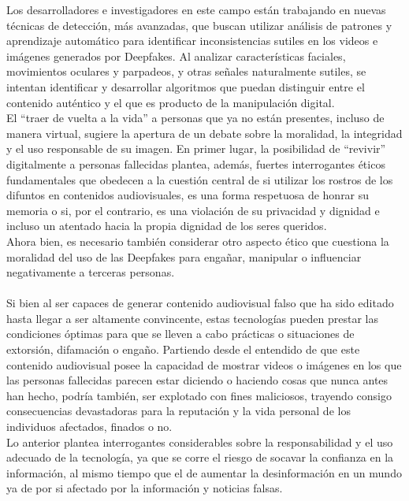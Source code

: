 Los desarrolladores e investigadores en este campo están trabajando en nuevas técnicas de detección, más avanzadas, que buscan utilizar análisis de patrones y aprendizaje automático para identificar inconsistencias sutiles en los videos e imágenes generados por Deepfakes. Al analizar características faciales, movimientos oculares y parpadeos, y otras señales naturalmente sutiles, se intentan identificar y desarrollar algoritmos que puedan distinguir entre el contenido auténtico y el que es producto de la manipulación digital.\\
El “traer de vuelta a la vida” a personas que ya no están presentes, incluso de manera virtual, sugiere la apertura de un debate sobre la moralidad, la integridad y el uso responsable de su imagen. En primer lugar, la posibilidad de “revivir” digitalmente a personas fallecidas plantea, además, fuertes interrogantes éticos fundamentales que obedecen a la cuestión central de si utilizar los rostros de los difuntos en contenidos audiovisuales, es una forma respetuosa de honrar su memoria o si, por el contrario, es una violación de su privacidad y dignidad e incluso un atentado hacia la propia dignidad de los seres queridos.\\
Ahora bien, es necesario también considerar otro aspecto ético que cuestiona la moralidad del uso de las Deepfakes para engañar, manipular o influenciar negativamente a terceras personas.\\\\
Si bien al ser capaces de generar contenido audiovisual falso que ha sido editado hasta llegar a ser altamente convincente, estas tecnologías pueden prestar las condiciones óptimas para que se lleven a cabo prácticas o situaciones de extorsión, difamación o engaño. Partiendo desde el entendido de que este contenido audiovisual posee la capacidad de mostrar videos o imágenes en los que las personas fallecidas parecen estar diciendo o haciendo cosas que nunca antes han hecho, podría también, ser explotado con fines maliciosos, trayendo consigo consecuencias devastadoras para la reputación y la vida personal de los individuos afectados, finados o no.\\
Lo anterior plantea interrogantes considerables sobre la responsabilidad y el uso adecuado de la tecnología, ya que se corre el riesgo de socavar la confianza en la información, al mismo tiempo que el de aumentar la desinformación en un mundo ya de por si afectado por la información y noticias falsas.\\
